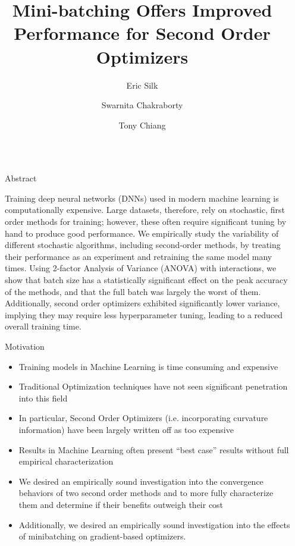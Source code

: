 \documentclass[final]{beamer}
\title{Mini-batching Offers Improved Performance for Second Order Optimizers}
\author{Eric Silk \inst{1} \and Swarnita Chakraborty \inst{2} \and Tony Chiang \inst{3}}
\institute[shortinst]{
  \inst{1} University of Washington/University of Illinois Urbana-Champaign \samelineand
  \inst{2} Washington State University \samelineand
  \inst{3} Pacific Northwest National Laboratory
}
\newlength{\sepwidth}
\newlength{\colwidth}
\newcommand{\separatorcolumn}{\begin{column}{\sepwidth}\end{column}}
\begin{document}
\begin{frame}[t]
  \begin{columns}[t]
    \separatorcolumn

    \begin{column}{\colwidth}

      \begin{block}{Abstract}

        Training deep neural networks (DNNs) used in modern machine learning is computationally
        expensive. Large datasets, therefore, rely on stochastic, first order methods for training;
        however, these often require significant tuning by hand to produce good performance. We
        empirically study the variability of different stochastic algorithms, including second-order
        methods, by treating their performance as an experiment and retraining the same model many
        times. Using 2-factor Analysis of Variance (ANOVA) with interactions, we show that batch
        size has a statistically significant effect on the peak accuracy of the methods, and that
        the full batch was largely the worst of them. Additionally, second order optimizers
        exhibited significantly lower variance, implying they may require less hyperparameter
        tuning, leading to a reduced overall training time.

      \end{block}

      \begin{alertblock}{Motivation}
        \begin{itemize}
          \item Training models in Machine Learning is time consuming and expensive
          \item Traditional Optimization techniques have not seen significant penetration into this field
          \item In particular, Second Order Optimizers (i.e. incorporating curvature information)
                have been largely written off as too expensive
          \item Results in Machine Learning often present ``best case'' results without full
                empirical characterization
          \item We desired an empirically sound investigation into the convergence behaviors of two
                second order methods and to more fully characterize them and determine if their benefits
                outweigh their cost
          \item Additionally, we desired an empirically sound investigation into the effects of
                minibatching on gradient-based optimizers.
        \end{itemize}


\end{alertblock}
\end{column}
\end{columns}
\end{frame}
\end{document}
